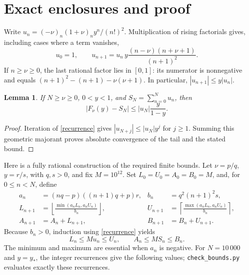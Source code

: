 \documentclass[11pt]{article}
\newtheorem{lemma}[theorem]{Lemma}
\newcommand{\F}{F}
\begin{document}
\section{Exact enclosures and proof}
Write $u_n=(-\nu)_n(1+\nu)_ny^n/(n!)^2$. Multiplication of rising
factorials gives, including cases where a term vanishes,
\begin{equation}\label{recurrence}
 u_0=1,\qquad
 u_{n+1}=u_n\,y\frac{(n-\nu)(n+\nu+1)}{(n+1)^2}.
\end{equation}
If $n\geq\nu\geq0$, the last rational factor lies in $[0,1]$:
its numerator is nonnegative and equals
$(n+1)^2-(n+1)-\nu(\nu+1)$. In particular,
$|u_{n+1}|\leq y|u_n|$.

\begin{lemma}\label{lemma:tail}
If $N\geq\nu\geq0$, $0<y<1$, and $S_N=\sum_{n=0}^N u_n$, then
\[
 |\F_\nu(y)-S_N|\leq |u_N|\frac{y}{1-y}.
\]
\end{lemma}
\begin{proof}
Iteration of \eqref{recurrence} gives $|u_{N+j}|\leq |u_N|y^j$
for $j\geq1$. Summing this geometric majorant proves absolute convergence
of the tail and the stated bound.
\end{proof}

Here is a fully rational construction of the required finite bounds.
Let $\nu=p/q$, $y=r/s$, with $q,s>0$, and fix $M=10^{12}$.
Set $L_0=U_0=A_0=B_0=M$, and, for $0\leq n<N$, define
\begin{align*}
 a_n&=(nq-p)((n+1)q+p)r,&
 b_n&=q^2(n+1)^2s,\\
 L_{n+1}&=\left\lfloor\frac{\min(a_nL_n,a_nU_n)}{b_n}\right\rfloor,&
 U_{n+1}&=\left\lceil\frac{\max(a_nL_n,a_nU_n)}{b_n}\right\rceil,\\
 A_{n+1}&=A_n+L_{n+1},& B_{n+1}&=B_n+U_{n+1}.
\end{align*}
Because $b_n>0$, induction using \eqref{recurrence} yields
\begin{equation}\label{invariants}
 L_n\leq Mu_n\leq U_n,\qquad A_n\leq MS_n\leq B_n.
\end{equation}
The minimum and maximum are essential when $a_n$ is negative.
For $N=10\,000$ and $y=y_*$, the integer recurrences give the following
values; \texttt{check\_bounds.py} evaluates exactly these recurrences.
\end{document}
